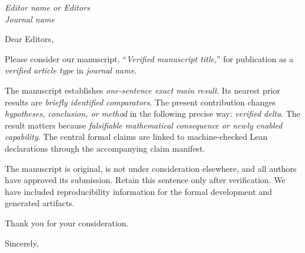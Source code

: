 \documentclass[11pt]{letter}
\newcommand{\placeholder}[1]{\textit{#1}}
\begin{document}
\begin{letter}{\placeholder{Editor name or Editors}\\\placeholder{Journal name}}
\opening{Dear Editors,}

Please consider our manuscript, ``\placeholder{Verified manuscript title},'' for publication as a \placeholder{verified article type} in \placeholder{journal name}.

The manuscript establishes \placeholder{one-sentence exact main result}. Its nearest prior results are \placeholder{briefly identified comparators}. The present contribution changes \placeholder{hypotheses, conclusion, or method} in the following precise way: \placeholder{verified delta}. The result matters because \placeholder{falsifiable mathematical consequence or newly enabled capability}. The central formal claims are linked to machine-checked Lean declarations through the accompanying claim manifest.

The manuscript is original, is not under consideration elsewhere, and all authors have approved its submission. Retain this sentence only after verification. We have included reproducibility information for the formal development and generated artifacts.

Thank you for your consideration.

\closing{Sincerely,}
\end{letter}
\end{document}
